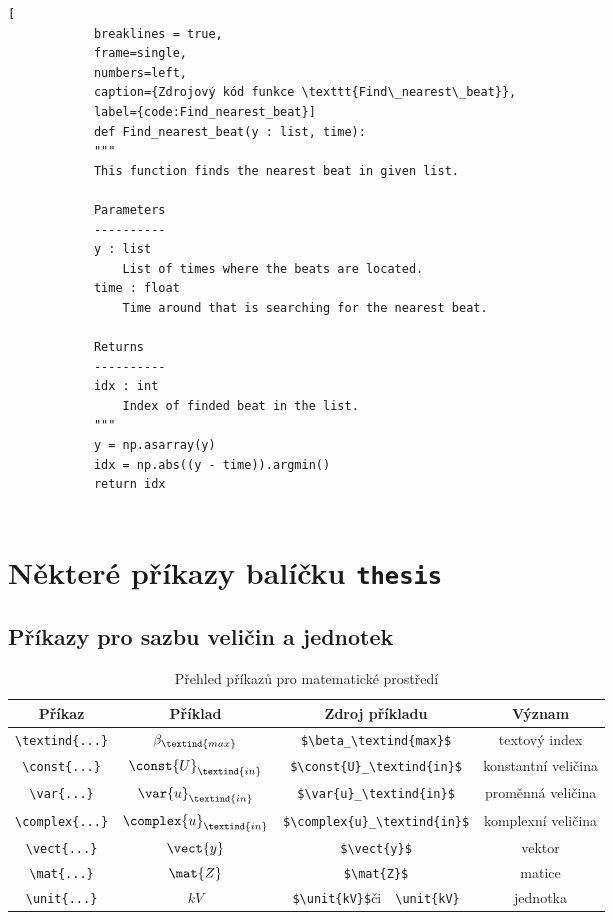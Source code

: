 	\begin{minipage}{\linewidth}
		\begin{lstlisting}[
			breaklines = true,
			frame=single,
			numbers=left,
			caption={Zdrojový kód funkce \texttt{Find\_nearest\_beat}},
			label={code:Find_nearest_beat}]
			def Find_nearest_beat(y : list, time):
			"""
			This function finds the nearest beat in given list.
		
			Parameters
			----------
			y : list
				List of times where the beats are located.
			time : float
				Time around that is searching for the nearest beat.
		
			Returns 
			----------
			idx : int
				Index of finded beat in the list.
			"""
			y = np.asarray(y)
			idx = np.abs((y - time)).argmin() 
			return idx
	
		\end{lstlisting}
	\end{minipage}

\chapter{Některé příkazy balíčku \texttt{thesis}}

\section{Příkazy pro sazbu veličin a jednotek}

\begin{table}[!h]
  \caption[Přehled příkazů]{Přehled příkazů pro matematické prostředí }
  \begin{center}
  	\small
	  \begin{tabular}{|c|c|c|c|}
	    \hline
	    Příkaz    						& Příklad 					& Zdroj příkladu  							& Význam  \\
	    \hline\hline
	    \verb|\textind{...}|	& $\beta_\textind{max}$ 	& \verb|$\beta_\textind{max}$|	& textový index \\
	    \hline
	    \verb|\const{...}| 		& $\const{U}_\textind{in}$ 				& \verb|$\const{U}_\textind{in}$|		& konstantní veličina \\
	    \hline
	    \verb|\var{...}| 		& $\var{u}_\textind{in}$ & \verb|$\var{u}_\textind{in}$| & proměnná veličina \\
	    \hline
	    \verb|\complex{...}| 	& $\complex{u}_\textind{in}$ & \verb|$\complex{u}_\textind{in}$| & komplexní veličina \\
	    \hline
	    \verb|\vect{...}| 		& $\vect{y}$ 						& \verb|$\vect{y}$| & vektor \\
	    \hline
	    \verb|\mat{...}| 	& $\mat{Z}$ 						& \verb|$\mat{Z}$| & matice \\
	    \hline
	    \verb|\unit{...}| 		& $\unit{kV}$ 						& \verb|$\unit{kV}$|\quad či\ \, \verb|\unit{kV}| & jednotka \\
	    \hline
	  \end{tabular}
  \end{center}
\end{table}



